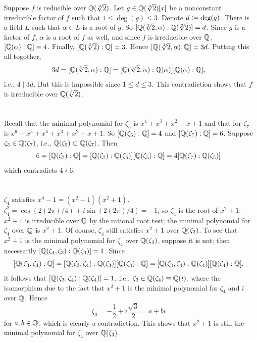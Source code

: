 \documentclass[12pt]{article}
\begin{document}
Suppose $f$ is reducible over $\mathbb{Q}(\sqrt[3]{2})$. 
Let $g \in \mathbb{Q}(\sqrt[3]{2})[x]$ be a nonconstant irreducible factor of $f$ such that $1 \leq \deg(g) \leq 3$. 
Denote $d \vcentcolon= \deg(g)$. 
There is a field $L$ such that $\alpha \in L$ is a root of $g$. 
So $[\mathbb{Q}(\sqrt[3]{2}, \alpha) : \mathbb{Q}(\sqrt[3]{2})] = d$. 
Since $g$ is a factor of $f$, $\alpha$ is a root of $f$ as well, and since $f$ is irreducible over $\mathbb{Q}$, $[\mathbb{Q}(\alpha) : \mathbb{Q}] = 4$. 
Finally, $[\mathbb{Q}(\sqrt[3]{2}) : \mathbb{Q}] = 3$. 
Hence $[\mathbb{Q}(\sqrt[3]{2}, \alpha), \mathbb{Q}] = 3d$. 
Putting this all togother, 
$$3d = [\mathbb{Q}(\sqrt[3]{2}, \alpha) : \mathbb{Q}] = [\mathbb{Q}(\sqrt[3]{2}, \alpha) : \mathbb{Q}(\alpha)][\mathbb{Q}(\alpha): \mathbb{Q}],$$
i.e., $4 \mid 3d$. 
But this is impossible since $1 \leq d \leq 3$. 
This contradiction shows that $f$ is irreducible over $\mathbb{Q}(\sqrt[3]{2})$. 

\section{} 
Recall that the minimal polynomial for $\zeta_5$ is $x^4 + x^3 + x^2 + x + 1$ and that for $\zeta_7$ is $x^6 + x^5 + x^4 + x^3 + x^2 + x + 1$.
So $[\mathbb{Q}(\zeta_5) : \mathbb{Q}] = 4$ and $[\mathbb{Q}(\zeta_7) : \mathbb{Q}] = 6$. 
Suppose $\zeta_5 \in \mathbb{Q}(\zeta_7)$, i.e., $\mathbb{Q}(\zeta_5) \subset \mathbb{Q}(\zeta_7)$. 
Then 
$$6 = [\mathbb{Q}(\zeta_7) : \mathbb{Q}] = [\mathbb{Q}(\zeta_7) : \mathbb{Q}(\zeta_5)] [\mathbb{Q}(\zeta_5) : \mathbb{Q}] = 4 [\mathbb{Q}(\zeta_7) : \mathbb{Q}(\zeta_5)]$$ 
which contradicts $4 \nmid 6$. 

\section{}
$\zeta_4$ satisfies $x^4 - 1 = (x^2 - 1)(x^2 + 1)$. 
$\zeta_{4}^{2} = \cos(2(2\pi) / 4) + i\sin(2(2 \pi) / 4) = -1$, so $\zeta_4$ is the root of $x^2 + 1$. 
$x^2 + 1$ is irreducible over $\mathbb{Q}$ by the rational root test;
the minimal polynomial for $\zeta_4$ over $\mathbb{Q}$ is $x^2 + 1$. 
Of course, $\zeta_4$ still satisfies $x^2 + 1$ over $\mathbb{Q}(\zeta_3)$. 
To see that $x^2 + 1$ is the minimal polynomial for $\zeta_4$ over $\mathbb{Q}(\zeta_3)$, suppose it is not; 
then necessarily $[\mathbb{Q}(\zeta_4, \zeta_3) : \mathbb{Q}(\zeta_3)] = 1$. 
Since 
$$[\mathbb{Q}(\zeta_3, \zeta_4) : \mathbb{Q}] = [\mathbb{Q}(\zeta_3, \zeta_4) : \mathbb{Q}(\zeta_3)][\mathbb{Q}(\zeta_3) : \mathbb{Q}] = [\mathbb{Q}(\zeta_3, \zeta_4) : \mathbb{Q}(\zeta_4)][\mathbb{Q}(\zeta_4) : \mathbb{Q}],$$
it follows that $[\mathbb{Q}(\zeta_3, \zeta_4) : \mathbb{Q}(\zeta_4)] = 1$,
i.e., $\zeta_3 \in \Q(\zeta_4) \equiv \Q(i)$, where the isomorphism due to the fact that $x^2 + 1$ is the minimal polynomial for $\zeta_4$ and $i$ over $\mathbb{Q}$. 
Hence 
$$\zeta_3 = -\frac{1}{2} + i \frac{\sqrt{3}}{2} = a + bi$$
for $a, b \in \mathbb{Q}$, which is clearly a contradiction. 
This shows that $x^2 + 1$ is still the minimal polynomial for $\zeta_4$ over $\mathbb{Q}(\zeta_3)$. 
\end{document}
